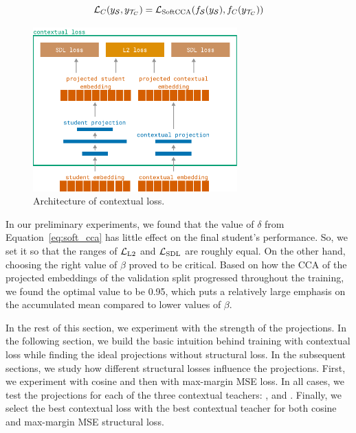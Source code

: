 \begin{equation}\label{eq:contextual_loss}
  \mathcal{L}_C(y_{\mathcal{S}}, y_{\mathcal{T}_C}) = \mathcal{L}_{\text{SoftCCA}}(
    f_{\mathcal{S}}(y_{\mathcal{S}}),
    f_C(y_{\mathcal{T}_C})
  )
\end{equation}

\begin{figure}

  \centering
  \includegraphics[width=0.7\textwidth]{img/contextual_loss.pdf}

  \caption{Architecture of contextual loss.}

  \label{fig:contextual_loss}

\end{figure}

In our preliminary experiments, we found that the value of $\delta$ from
Equation~\ref{eq:soft_cca} has little effect on the final student's
performance. So, we set it so that the ranges of $\mathcal{L}_{\text{L2}}$ and
$\mathcal{L}_{\text{SDL}}$ are roughly equal. On the other hand, choosing the right
value of $\beta$ proved to be critical. Based on how the CCA of the projected
embeddings of the validation split progressed throughout the training, we found
the optimal value to be 0.95, which puts a relatively large emphasis on the
accumulated mean compared to lower values of $\beta$.

In the rest of this section, we experiment with the strength of the
projections. In the following section, we build the basic intuition behind
training with contextual loss while finding the ideal projections without
structural loss. In the subsequent sections, we study how different
structural losses influence the projections. First, we experiment with cosine
and then with max-margin MSE loss. In all cases, we test the projections for
each of the three contextual teachers: ,  and
. Finally, we select the best contextual loss with the best
contextual teacher for both cosine and max-margin MSE structural loss.

